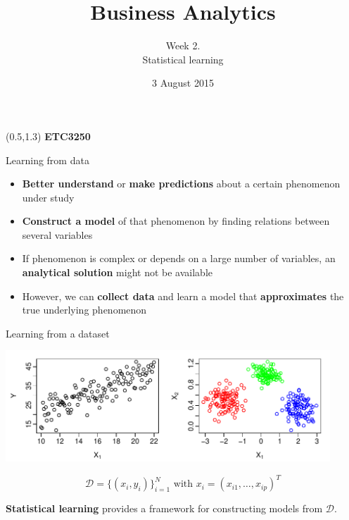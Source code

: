 \documentclass[14pt]{beamer}
\title[Statistical learning]{Business Analytics}
\author{Week 2.\\ Statistical learning}
\date{3 August 2015}
\begin{document}
\begin{frame}[plain]{}
\maketitle
\begin{textblock}{11}(0.5,1.3){\color{white}\large
\textbf{ETC3250}}
\end{textblock}


\end{frame}

\begin{frame}{Learning from data}

\begin{itemize}

\item \textbf{Better understand} or \textbf{make predictions} about a certain
phenomenon under study

\item \textbf{Construct a model} of that phenomenon by finding relations between several variables

\item If phenomenon is complex or depends on a large number of variables, an \textbf{analytical solution} might not be available

\item However, we can  \textbf{collect data} and learn a model that  \textbf{approximates} the true underlying phenomenon

\end{itemize}

\end{frame}

\begin{frame}{Learning from a dataset}

\centerline{\includegraphics[width=12.2cm]{statlearn.pdf}}

$$ \mathcal{D} = \{(x_i, y_i)\}_{i = 1}^N \text{~with~} x_i = (x_{i1}, \dots, x_{ip})^{T}$$

\pause
\begin{block}\small
\textbf{Statistical learning} provides a framework for constructing models from $\mathcal{D}$.
\end{block}

\end{frame}
\end{document}
